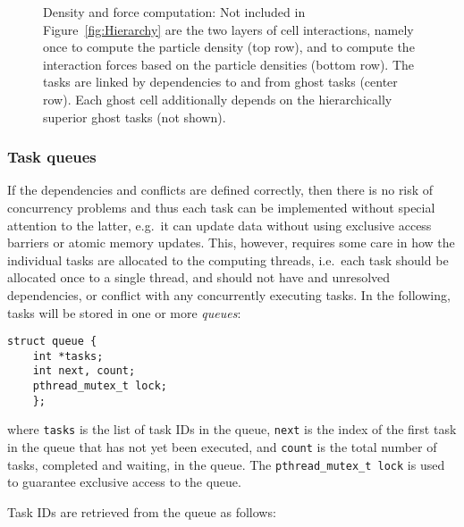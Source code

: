 \documentclass[final]{siamltex}
\newcommand{\fig}[1]
    {Figure~\ref{fig:#1}}
\begin{document}
\begin{figure}[ht]
    \centerline{}
    
    \caption{Density and force computation: Not included in \fig{Hierarchy}
        are the two layers of cell interactions, namely once to compute
        the particle density (top row), and to compute the interaction
        forces based on the particle densities (bottom row).
        The tasks are linked by dependencies to and from ghost tasks
        (center row).
        Each ghost cell additionally depends on the hierarchically superior
        ghost tasks (not shown).
        }
    \label{fig:DensityForce}
\end{figure}


\subsubsection{Task queues}

If the dependencies and conflicts are defined correctly, then
there is no risk of concurrency problems and thus each task
can be implemented without special attention to the latter,
e.g.~it can update data without using exclusive access barriers
or atomic memory updates.
This, however, requires some care in how the individual tasks
are allocated to the computing threads, i.e.~each task should
be allocated once to a single thread, and should not have
and unresolved dependencies, or conflict with any concurrently
executing tasks.
In the following, tasks will be stored in one or more {\em queues}:
        
\begin{center}\begin{minipage}{0.8\textwidth}
    \begin{lstlisting}
struct queue {
    int *tasks;
    int next, count;
    pthread_mutex_t lock;
    };
    \end{lstlisting}
\end{minipage}\end{center}

\noindent where {\tt tasks} is the list of task IDs in the queue, {\tt next}
is the index of the first task in the queue that has not yet been executed,
and {\tt count} is the total number of tasks, completed and waiting,
in the queue.
The {\tt pthread\_mutex\_t lock} is used to guarantee exclusive access
to the queue.

Task IDs are retrieved from the queue as follows:        
\end{document}
